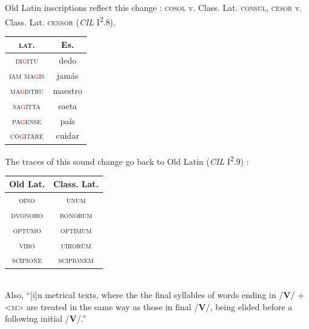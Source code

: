 \documentclass{report}[12pt]
\begin{document}
\begin{tcolorbox}[title=Nasal Spirant Law]

\end{tcolorbox}

Old Latin inscriptions reflect this change \cite[p.~17]{companion_to_latin}: \textsc{cosol} v. Class. Lat. \textsc{consul}, \textsc{cesor} v. Class. Lat. \textsc{censor} (\emph{CIL} I\textsuperscript{2}.8).

\begin{tcolorbox}[title=Elision of Intervocalic /g/]

\end{tcolorbox}

\begin{tabular}{c c}
  \textsc{lat.} & Es. \\
  \hline
  \textsc{di\textcolor{red}{g}itu} & dedo \\
  \textsc{iam ma\textcolor{red}{g}is} & jamás \\
  \textsc{ma\textcolor{red}{g}istru} & maestro \\
  \textsc{sa\textcolor{red}{g}itta} & saeta \\
  \textsc{pa\textcolor{red}{g}ense} & país \\
  \textsc{c\={o}\textcolor{red}{g}it\={a}re} & cuidar \\
\end{tabular}

\begin{tcolorbox}[title=Elision of Coda /m/]
  
\end{tcolorbox}

The traces of this sound change go back to Old Latin (\emph{CIL} I\textsuperscript{2}.9) \cite[p.~17]{companion_to_latin}: \\
\begin{tabular}{c c}
  Old Lat. & Class. Lat. \\
  \hline
  \textsc{oino} & \textsc{unum} \\
  \textsc{dvonoro} & \textsc{bonorum} \\
  \textsc{optumo} & \textsc{optimum} \\
  \textsc{viro} & \textsc{uirorum} \\
  \textsc{scipione} & \textsc{scipionem} \\
\end{tabular} \\
Also, ``[i]n metrical texts, where the the final syllables of words ending in /\textbf{V}/ $+$ <\textsc{m}> are treated in the same way as those in final /\textbf{V}/, being elided before a following initial /\textbf{V}/.'' \cite[p.~87]{companion_to_latin}
\end{document}
